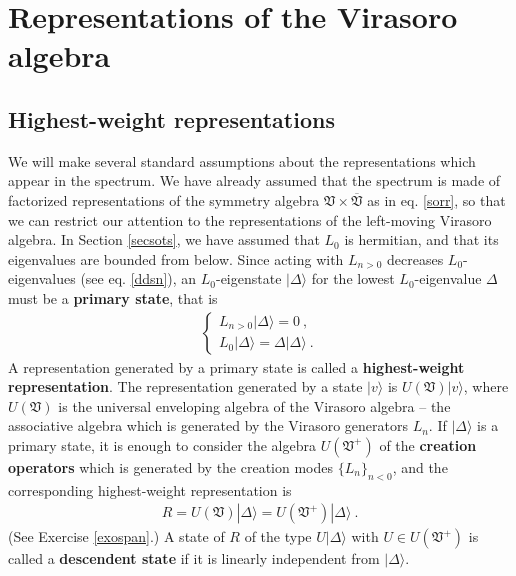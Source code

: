 \documentclass[12pt,a4paper,notitlepage]{report}
\numberwithin{equation}{section}
\theoremstyle{break}
\begin{document}
\section{Representations of the Virasoro algebra \label{secrep}}

\subsection{Highest-weight representations}

We will make several standard assumptions about the representations which appear in the spectrum.
We have already assumed that the spectrum is made of factorized representations of the symmetry algebra $\mathfrak{V}\times \overline{\mathfrak{V}}$ as in eq. \eqref{sorr}, so that we can restrict our attention to the representations of the left-moving Virasoro algebra.
In Section \ref{secsots}, we have assumed that $L_0$ is hermitian, and that its eigenvalues are bounded from below.
Since acting with $L_{n>0}$ decreases $L_0$-eigenvalues (see eq. \eqref{ddsn}), an $L_0$-eigenstate $|\Delta\rangle$ for the lowest $L_0$-eigenvalue $\Delta$ must be a \textbf{\boldmath primary state}, that is
\begin{align}
 \boxed{\left\{\begin{array}{l}  L_{n>0}|\Delta\rangle = 0\ , \\ L_0 |\Delta\rangle = \Delta |\Delta\rangle\ .\end{array}\right. }
\label{lvlv}
\end{align}
A representation generated by a primary state is called a \textbf{\boldmath highest-weight representation}.
The representation generated by a state $|v\rangle$ is $U(\mathfrak{V})|v\rangle$, where $U(\mathfrak{V})$ is the universal enveloping algebra of the Virasoro algebra -- the associative algebra which is generated by the Virasoro generators $L_n$.
If $|\Delta\rangle$ is a primary state, it is enough to consider the algebra $U(\mathfrak{V}^+)$ of the \textbf{\boldmath creation operators} which is generated by the creation modes $\{L_n\}_{n<0}$, and the corresponding highest-weight representation is 
\begin{align}
 R = U(\mathfrak{V})|\Delta\rangle =U(\mathfrak{V}^+)|\Delta\rangle\ .
\label{ruv}
\end{align}
(See Exercise \ref{exospan}.)
A state of $R$ of the type $U|\Delta\rangle$ with $U\in U(\mathfrak{V}^+)$ is called a \textbf{\boldmath descendent state} if it is linearly independent from $|\Delta\rangle$.
\end{document}
